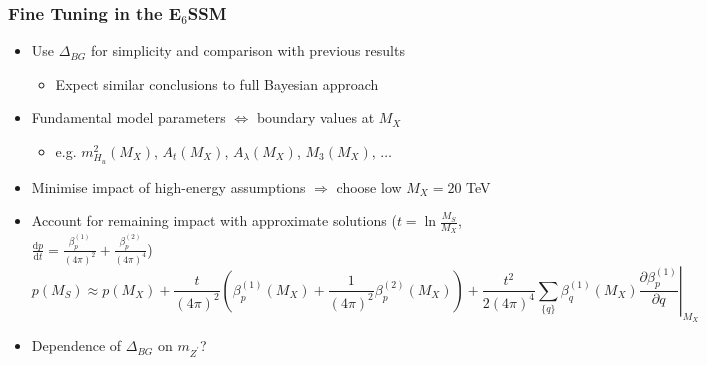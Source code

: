\documentclass[10pt,aspectratio=169]{beamer}
\begin{document}
\begin{frame}
  \frametitle{Fine Tuning in the E$_6$SSM}
  \begin{itemize} \itemsep1em
    \item Use $\Delta_{BG}$ for simplicity and comparison with
      previous results
      \begin{itemize}
        \item {\color{blue} Expect similar conclusions to full Bayesian
          approach}
      \end{itemize}
    \item Fundamental model parameters $\Leftrightarrow$ boundary values at
      $M_X$
      \begin{itemize}
        \item e.g. $m_{H_u}^2(M_X)$, $A_t(M_X)$, $A_\lambda(M_X)$, $M_3(M_X)$,
          $\ldots$
      \end{itemize}
    \item Minimise impact of high-energy assumptions $\Rightarrow$ choose
      low $M_X = 20$ TeV
    \item Account for remaining impact with approximate solutions
      ($t = \ln \frac{M_S}{M_X}$, $\frac{\mathrm{d}p}{\mathrm{d}t} =
      \frac{\beta_p^{(1)}}{\left ( 4\pi\right )^2}
      + \frac{\beta_p^{(2)}}{\left (4\pi \right )^4}$)
      \begin{equation*}
        p (M_S) \approx p(M_X) + \frac{t}{\left ( 4 \pi \right )^2}
          \left ( \beta_p^{(1)} (M_X) + \frac{1}{\left ( 4\pi \right )^2}
          \beta_p^{(2)}(M_X) \right ) + \frac{t^2}{2\left ( 4\pi \right )^4}
          \sum_{\{q\}} \beta_q^{(1)}(M_X) \left . \frac{\partial
          \beta_p^{(1)}}{\partial q} \right |_{M_X}
      \end{equation*}
    \item Dependence of $\Delta_{BG}$ on $m_{Z^\prime}$?
  \end{itemize}
\end{frame}
\end{document}
